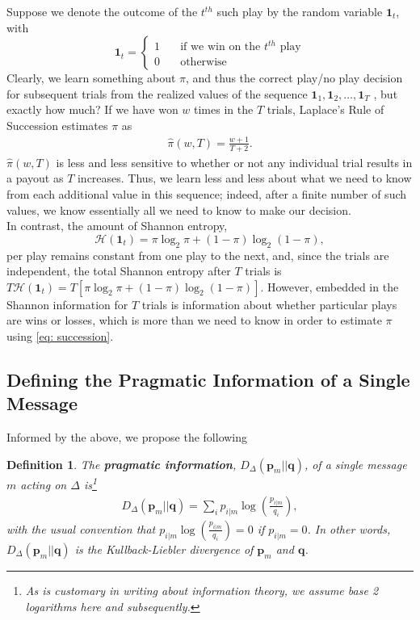 \documentclass[11pt]{article}
\newtheorem*{definition}{Definition}
\begin{document}
Suppose we denote the outcome of the $t^{th}$ such play by the random variable $\mathbf 1_t$, with
$$
\mathbf 1_t = \begin{cases} 1 & \quad \text{if we win on the $t^{th}$ play} \\
                             0 & \quad \text{otherwise}
                     \end{cases}
$$
Clearly, we learn something about $\pi$, and thus the correct play/no play decision for subsequent trials from the realized values of the sequence $\mathbf 1_1, \mathbf 1_2, \ldots, \mathbf 1_T$ , but exactly how much?
If we have won $w$ times in the $T$ trials, Laplace's Rule of Succession \cite{succession} estimates $\pi$ as
\begin{align}
\hat \pi(w, T) = \frac{w+1}{T+2}   \label{eq: succession}.
\end{align}
$\hat \pi(w, T)$ is less and less sensitive to whether or not any individual trial results in a payout as $T$ increases.  Thus, we learn less and less about what we need to know from each additional value in this sequence; indeed, after a finite number of such values, we know essentially all we need to know to make our decision.\\
  
In contrast, the amount of Shannon entropy, 
$$
\mathcal H(\mathbf 1_t) = \pi \log_2 \pi + (1-\pi) \log_2 (1-\pi),
$$
per play remains constant from one play to the next, and, since the trials are independent, the total Shannon entropy 
after $T$ trials is $T\mathcal H(\mathbf 1_t) = T \left[\pi \log_2 \pi + (1-\pi) \log_2 (1-\pi)\right]$.  However, 
embedded in the Shannon information for $T$ trials is information about whether particular plays are wins or losses, 
which is more than we need to know in order to estimate $\pi$ using \eqref{eq: succession}.\\

\subsection{Defining the Pragmatic Information of a Single Message}
Informed by the above, we propose the following
\begin{definition}
The {\bf pragmatic information}, $D_\Delta(\mathbf p_m || \mathbf q)$,
 of a single message $m$ acting on $\Delta$ is\footnote{As is customary in writing about information theory, we assume base
 2 logarithms here and subsequently.}
\begin{align}
D_\Delta(\mathbf p_m || \mathbf q) = \sum_i  p_{i|m} \log \left(\frac{p_{i|m}}{q_i}\right), \label{eq: BasicDef}
\end{align}
with the usual convention that $p_{i|m} \log \left(\frac{p_{i|m}}{q_i}\right) = 0$ if $p_{i|m} =0$.  In other words,
$D_\Delta(\mathbf p_m || \mathbf q)$ is the Kullback-Liebler divergence of $\mathbf p_m$ and $\mathbf q$.
\end{definition}
\end{document}

